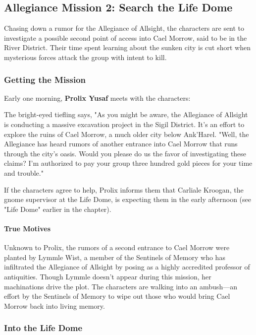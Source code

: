 \documentclass[a4paper, 11pt, bg=full, twocolumn, nooutline]{dndbook}
\begin{document}
\subsection{Allegiance Mission 2: Search the Life Dome}

Chasing down a rumor for the Allegiance of Allsight, the characters are sent to investigate a possible second point of access into Cael Morrow, said to be in the River District. Their time spent learning about the sunken city is cut short when mysterious forces attack the group with intent to kill.

\subsubsection{Getting the Mission}

Early one morning, \textbf{Prolix Yusaf} meets with the characters:

\begin{DndReadAloud}
The bright-eyed tiefling says, "As you might be aware, the Allegiance of Allsight is conducting a massive excavation project in the Sigil District. It's an effort to explore the ruins of Cael Morrow, a much older city below Ank'Harel.
"Well, the Allegiance has heard rumors of another entrance into Cael Morrow that runs through the city's oasis. Would you please do us the favor of investigating these claims? I'm authorized to pay your group three hundred gold pieces for your time and trouble."
\end{DndReadAloud}

If the characters agree to help, Prolix informs them that Carliale Kroogan, the gnome supervisor at the Life Dome, is expecting them in the early afternoon (see "Life Dome" earlier in the chapter).

\paragraph{True Motives}

Unknown to Prolix, the rumors of a second entrance to Cael Morrow were planted by Lymmle Wist, a member of the Sentinels of Memory who has infiltrated the Allegiance of Allsight by posing as a highly accredited professor of antiquities. Though Lymmle doesn't appear during this mission, her machinations drive the plot. The characters are walking into an ambush---an effort by the Sentinels of Memory to wipe out those who would bring Cael Morrow back into living memory.

\subsubsection{Into the Life Dome}
\end{document}
